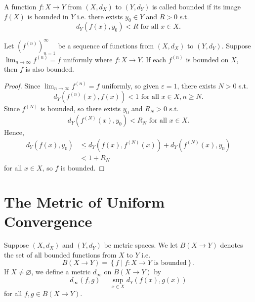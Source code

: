 \begin{definition} \label{def: bounded function}
    A function \(f:X \to Y\) from \((X, d_X)\) to \((Y, d_Y)\) is called bounded if its image \(f(X)\) is bounded in \(Y\) i.e. there exists \(y_0 \in Y\) and \(R > 0\) s.t. 
    \[
        d_Y \left( f(x), y_0 \right) < R \text{ for all } x \in X.  
    \]      
\end{definition}

\begin{proposition}
    Let \(\left( f^{(n)} \right)_{n=1}^{\infty}  \) be a sequence of functions from \((X, d_X)\) to \((Y, d_Y)\). Suppose \(\lim_{n \to \infty} f^{(n)} = f \) uniformly where \(f:X \to Y\). If each \(f^{(n)}\) is bounded on \(X\), then \(f\) is also bounded.       
\end{proposition}
\begin{proof}
    Since \(\lim_{n \to \infty} f^{(n)} = f \) uniformly, so given \(\varepsilon = 1\), there exists \(N > 0\) s.t. 
    \[
        d_Y \left( f^{(n)}(x), f(x) \right) < 1 \text{ for all } x \in X, n \ge N.  
    \] Since \(f^{(N)}\) is bounded, so there exists \(y_0\) and \(R_N > 0\) s.t. 
    \[
        d_Y \left( f^{(N)}(x), y_0 \right) < R_N \text{ for all } x \in X.  
    \] 
    Hence, 
    \begin{align*}
        d_Y \left( f(x), y_0 \right) &\le d_Y \left( f(x), f^{(N)}(x) \right) + d_Y \left( f^{(N)}(x), y_0 \right) \\
        &< 1 + R_N   
    \end{align*}
    for all \(x \in X\), so \(f\) is bounded.    
\end{proof}

\section{The Metric of Uniform Convergence}
\begin{definition}
    Suppose \((X, d_X)\) and \((Y, d_Y)\) be metric spaces. We let \(B(X \to Y)\) denotes the set of all bounded functions from \(X\) to \(Y\) i.e. 
    \[
        B(X \to Y) = \left\{ f \mid f:X \to Y \text{ is  bounded}  \right\}. 
    \] 
    If \(X \neq \varnothing \), we define a metric \(d_\infty \) on \(B(X \to Y)\) by 
    \[
        d_\infty \left( f, g \right) = \sup _{x \in X} d_Y (f(x), g(x)) 
    \] for all \(f, g \in B(X \to Y)\).     
\end{definition}

